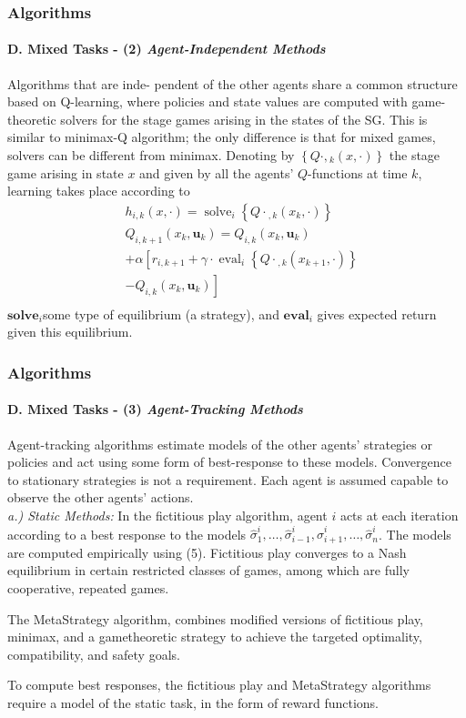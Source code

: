 \documentclass{beamer}
\begin{document}
\begin{frame}
\frametitle{Algorithms}
\framesubtitle{D. Mixed Tasks - (2) \textit{Agent-Independent Methods}}
Algorithms that are inde-
pendent of the other agents share a common structure based on
Q-learning, where policies and state values are computed with
game-theoretic solvers for the stage games arising in the states
of the SG. This is similar to minimax-Q algorithm; the only
difference is that for mixed games, solvers can be different from
minimax.\vspace{4pt}
Denoting by $\left\{Q \cdot,{ }_k(x, \cdot)\right\}$ the stage game arising in state $x$ and given by all the agents' $Q$-functions at time $k$, learning takes place according to
$$
\begin{aligned}
& h_{i, k}(x, \cdot)=\operatorname{solve}_i\left\{Q \cdot{ }_{, k}\left(x_k, \cdot\right)\right\} \\
& Q_{i, k+1}\left(x_k, \boldsymbol{u}_k\right)=Q_{i, k}\left(x_k, \boldsymbol{u}_k\right) \\
& +\alpha\left[r_{i, k+1}+\gamma \cdot \operatorname{eval}_i\left\{Q \cdot{ }_{, k}\left(x_{k+1}, \cdot\right)\right\}\right. \\
& \left.-Q_{i, k}\left(x_k, \boldsymbol{u}_k\right)\right] \\
\end{aligned}
$$
 $\textbf{solve}_i$some type of equilibrium
(a strategy), and $\textbf{eval}_i$ gives expected return given
this equilibrium.
\end{frame}

\begin{frame}
\frametitle{Algorithms}
\framesubtitle{D. Mixed Tasks - (3) \textit{Agent-Tracking Methods}}
Agent-tracking algorithms estimate models of the other agents’ strategies or policies
and act using some form of best-response to these models. Convergence to stationary strategies is not a requirement. Each agent
is assumed capable to observe the other agents' actions.\\
\textit{a.) Static Methods:} In the fictitious play algorithm, agent $i$ acts at each iteration according to a best response to the models $\hat{\sigma}_1^i, \ldots, \hat{\sigma}_{i-1}^i, \hat{\sigma}_{i+1}^i, \ldots, \hat{\sigma}_n^i$. The models are computed empirically using (5). Fictitious play converges to a Nash equilibrium in certain restricted classes of games, among which are fully cooperative, repeated games.

The MetaStrategy algorithm, combines modified versions of fictitious play, minimax, and a gametheoretic strategy to achieve the targeted optimality, compatibility, and safety goals.

To compute best responses, the fictitious play and MetaStrategy algorithms require a model of the static task, in the form of reward functions.

\end{frame}
\end{document}
